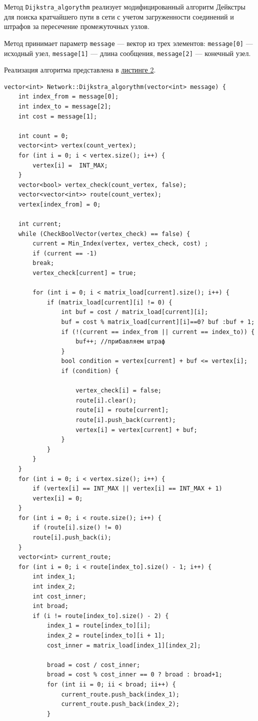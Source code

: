 \documentclass[11pt,a4paper,final]{article} %
\begin{document}
Метод \texttt{Dijkstra\_algorythm} реализует модифицированный алгоритм Дейкстры для поиска кратчайшего пути в сети с учетом загруженности соединений и штрафов за пересечение промежуточных узлов.

Метод принимает параметр \texttt{message} — вектор из трех элементов: \texttt{message[0]} — исходный узел, \texttt{message[1]} — длина сообщения, \texttt{message[2]} — конечный узел.

Реализация алгоритма представлена в \hyperref[lst2]{листинге 2}.

\begin{lstlisting}[label=lst2, caption = {Модифицированный алгоритм Дейкстры}]
vector<int> Network::Dijkstra_algorythm(vector<int> message) {
	int index_from = message[0];
	int index_to = message[2];
	int cost = message[1];
	
	int count = 0;
	vector<int> vertex(count_vertex);
	for (int i = 0; i < vertex.size(); i++) {
		vertex[i] =  INT_MAX;
	}
	vector<bool> vertex_check(count_vertex, false);
	vector<vector<int>> route(count_vertex);
	vertex[index_from] = 0;
	
	int current;
	while (CheckBoolVector(vertex_check) == false) {
		current = Min_Index(vertex, vertex_check, cost) ;
		if (current == -1)
		break;
		vertex_check[current] = true;
		
		for (int i = 0; i < matrix_load[current].size(); i++) {
			if (matrix_load[current][i] != 0) {
				int buf = cost / matrix_load[current][i];
				buf = cost % matrix_load[current][i]==0? buf :buf + 1;
				if (!(current == index_from || current == index_to)) {
					buf++; //прибавляем штраф
				}
				bool condition = vertex[current] + buf <= vertex[i];
				if (condition) {
					
					vertex_check[i] = false;
					route[i].clear();
					route[i] = route[current];
					route[i].push_back(current);
					vertex[i] = vertex[current] + buf;
				}
			}
		}
	}
	for (int i = 0; i < vertex.size(); i++) {
		if (vertex[i] == INT_MAX || vertex[i] == INT_MAX + 1)
		vertex[i] = 0;
	}
	for (int i = 0; i < route.size(); i++) {
		if (route[i].size() != 0)
		route[i].push_back(i);
	}
	vector<int> current_route;
	for (int i = 0; i < route[index_to].size() - 1; i++) {
		int index_1;
		int index_2;
		int cost_inner;
		int broad;
		if (i != route[index_to].size() - 2) {
			index_1 = route[index_to][i];
			index_2 = route[index_to][i + 1];
			cost_inner = matrix_load[index_1][index_2];
			
			broad = cost / cost_inner;
			broad = cost % cost_inner == 0 ? broad : broad+1;
			for (int ii = 0; ii < broad; ii++) {
				current_route.push_back(index_1);
				current_route.push_back(index_2);
			}
			

\end{lstlisting}
\end{document}
